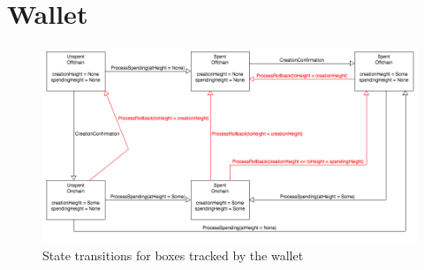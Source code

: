 \documentclass[]{article}   %
\begin{document}
\section{Wallet}

\begin{figure}[H]
    \centering
    \includegraphics[width=\textwidth]{img/box-transition.png}
    \caption{State transitions for boxes tracked by the wallet
    \label{fig:box-transaction}}
\end{figure}
\end{document}
